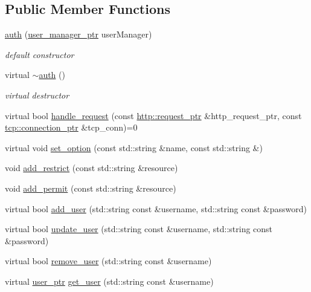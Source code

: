 \subsection*{Public Member Functions}
\begin{DoxyCompactItemize}
\item 
\hyperlink{classpion_1_1http_1_1auth_a464d923e5f67955ae6862f749ea79cd7}{auth} (\hyperlink{namespacepion_a20602680730b88b8efd08b3730d601af}{user\-\_\-manager\-\_\-ptr} user\-Manager)
\begin{DoxyCompactList}\small\item\em default constructor \end{DoxyCompactList}\item 
virtual \hyperlink{classpion_1_1http_1_1auth_a8e58182470ebd406f5754064a890786c}{$\sim$auth} ()
\begin{DoxyCompactList}\small\item\em virtual destructor \end{DoxyCompactList}\item 
virtual bool \hyperlink{classpion_1_1http_1_1auth_ad59da7a2c24929b7dd4d41c5679bb8bf}{handle\-\_\-request} (const \hyperlink{namespacepion_1_1http_ace432b70a9459d50ff4969a7a47f0ccb}{http\-::request\-\_\-ptr} \&http\-\_\-request\-\_\-ptr, const \hyperlink{namespacepion_1_1tcp_a6c9b7497068009f6d81d95ec0b0627d6}{tcp\-::connection\-\_\-ptr} \&tcp\-\_\-conn)=0
\item 
virtual void \hyperlink{classpion_1_1http_1_1auth_a49861152e006dc35880152ed0e7a6e92}{set\-\_\-option} (const std\-::string \&name, const std\-::string \&)
\item 
void \hyperlink{classpion_1_1http_1_1auth_a4f3dee0db0f53e8c78a24970fcd920ea}{add\-\_\-restrict} (const std\-::string \&resource)
\item 
void \hyperlink{classpion_1_1http_1_1auth_a915cab76915bb3140007d4a432f881ce}{add\-\_\-permit} (const std\-::string \&resource)
\item 
virtual bool \hyperlink{classpion_1_1http_1_1auth_a5d2af1bf25e6e3342cafe8b1f2cf9df9}{add\-\_\-user} (std\-::string const \&username, std\-::string const \&password)
\item 
virtual bool \hyperlink{classpion_1_1http_1_1auth_a850f65087e873e31de22b0a0fef79232}{update\-\_\-user} (std\-::string const \&username, std\-::string const \&password)
\item 
virtual bool \hyperlink{classpion_1_1http_1_1auth_a5bb4dce624e8cfe416951bbed3ddce43}{remove\-\_\-user} (std\-::string const \&username)
\item 
virtual \hyperlink{namespacepion_afd2ae32f926db1286ba2e83011456e11}{user\-\_\-ptr} \hyperlink{classpion_1_1http_1_1auth_aa066cc49589f0629b5b6e2a0e7050516}{get\-\_\-user} (std\-::string const \&username)
\end{DoxyCompactItemize}
